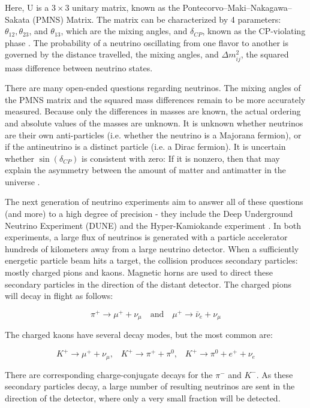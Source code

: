 Here, U is a $3 \times 3$ unitary matrix, known as the Pontecorvo–Maki–Nakagawa–Sakata (PMNS) Matrix. The matrix can be characterized by 4 parameters: $\theta_{12}, \theta_{23}$, and $\theta_{13}$, which are the mixing angles, and $\delta_{CP}$, known as the CP-violating phase \cite{pdg2018}. The probability of a neutrino oscillating from one flavor to another is governed by the distance travelled, the mixing angles, and $\Delta m_{ij}^2$, the squared mass difference between neutrino states. 


There are many open-ended questions regarding neutrinos.
The mixing angles of the PMNS matrix and the squared mass differences remain to be more accurately measured.
Because only the differences in masses are known, the actual ordering and absolute values of the masses are unknown.
It is unknown whether neutrinos are their own anti-particles (i.e. whether the neutrino is a Majorana fermion), or if the antineutrino is a distinct particle (i.e. a Dirac fermion).
It is uncertain whether $\sin(\delta_{CP})$ is consistent with zero: If it is nonzero, then that may explain the asymmetry between the amount of matter and antimatter in the universe \cite{neutrinoCP}.

The next generation of neutrino experiments aim to answer all of these questions (and more) to a high degree of precision - they include the Deep Underground Neutrino Experiment (DUNE) \cite{duneDesign} and the Hyper-Kamiokande experiment \cite{hyperKDesign}.
In both experiments, a large flux of neutrinos is generated with a particle accelerator hundreds of kilometers away from a large neutrino detector.
When a sufficiently energetic particle beam hits a target, the collision produces secondary particles: mostly charged pions and kaons.
Magnetic horns are used to direct these secondary particles in the direction of the distant detector.
The charged pions will decay in flight as follows:

$$ \pi^+ \rightarrow \mu^+ + \nu_\mu \quad   \text{and} \quad \mu^+ \rightarrow \bar{\nu}_e + \nu_\mu$$

The charged kaons have several decay modes, but the most common are:

$$ K^+ \rightarrow \mu^+ + \nu_\mu \text{,} \quad  K^+ \rightarrow \pi^+ + \pi^0  \text{,}\quad K^+ \rightarrow \pi^0 + e^+ + \nu_e$$

There are corresponding charge-conjugate decays for the $\pi^-$ and $K^-$. 
As these secondary particles decay, a large number of resulting neutrinos are sent in the direction of the detector, where only a very small fraction will be detected.

